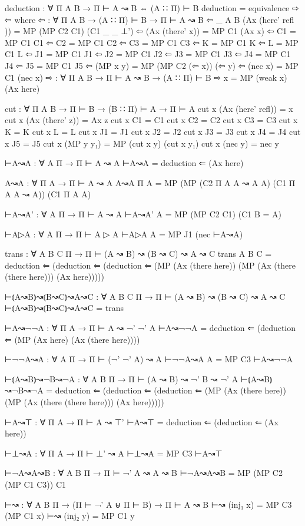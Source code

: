 \begin{spverbatim}
deduction : ∀ {Π A B} → Π ⊢ A ↝ B ⇔ (A ∷ Π) ⊢ B
deduction = equivalence ⇨ ⇦
  where
  ⇦ : ∀ {Π A B} → (A ∷ Π) ⊢ B → Π ⊢ A ↝ B
  ⇦ {_} {A} {B} (Ax (here' refl )) = MP (MP C2 C1) (C1 {_} {_} {⊥'})
  ⇦ (Ax (there' x)) = MP C1 (Ax x)
  ⇦ C1 = MP C1 C1
  ⇦ C2 = MP C1 C2
  ⇦ C3 = MP C1 C3
  ⇦ K = MP C1 K
  ⇦ L = MP C1 L
  ⇦ J1 = MP C1 J1
  ⇦ J2 = MP C1 J2
  ⇦ J3 = MP C1 J3
  ⇦ J4 = MP C1 J4
  ⇦ J5 = MP C1 J5
  ⇦ (MP x y) = MP (MP C2 (⇦ x)) (⇦ y)
  ⇦ (nec x) = MP C1 (nec x)
  ⇨ : ∀ {Π A B} → Π ⊢ A ↝ B → (A ∷ Π) ⊢ B
  ⇨ x = MP (weak x) (Ax here)

cut : ∀ {Π A B} → Π ⊢ B → (B ∷ Π) ⊢ A → Π ⊢ A
cut x (Ax (here' refl)) = x
cut x (Ax (there' z)) = Ax z
cut x C1 = C1
cut x C2 = C2
cut x C3 = C3
cut x K = K
cut x L = L
cut x J1 = J1
cut x J2 = J2
cut x J3 = J3
cut x J4 = J4
cut x J5 = J5
cut x (MP y y₁) = MP (cut x y) (cut x y₁)
cut x (nec y) = nec y

⊢A↝A : ∀ {A Π} → Π ⊢ A ↝ A
⊢A↝A = deduction ⇐ (Ax here)

A↝A : ∀ {Π A} → Π ⊢ A ↝ A
A↝A {Π} {A} = MP (MP (C2 {Π} {A} {A ↝ A} {A}) (C1 {Π} {A} {A ↝ A})) (C1 {Π} {A} {A})

⊢A↝A' : ∀ {A Π} → Π ⊢ A ↝ A
⊢A↝A' {A} = MP (MP C2 C1) (C1 {B = A})

⊢A▷A : ∀ {A Π} → Π ⊢ A ▷ A
⊢A▷A {A} = MP J1 (nec ⊢A↝A)

trans : ∀ {A B C Π} → Π ⊢ (A ↝ B) ↝ (B ↝ C) ↝ A ↝ C
trans {A} {B} {C} = deduction ⇐ (deduction ⇐ (deduction ⇐ (MP (Ax (there here))
  (MP (Ax (there (there here))) (Ax here)))))

⊢⦅A↝B⦆↝⦅B↝C⦆↝A↝C : ∀ {A B C Π} → Π ⊢ (A ↝ B) ↝ (B ↝ C) ↝ A ↝ C
⊢⦅A↝B⦆↝⦅B↝C⦆↝A↝C = trans

⊢A↝¬¬A : ∀ {Π A} → Π ⊢ A ↝ ¬' ¬' A
⊢A↝¬¬A = deduction ⇐ (deduction ⇐ (MP (Ax here) (Ax (there here))))

⊢¬¬A↝A : ∀ {A Π} → Π ⊢ (¬' ¬' A) ↝ A
⊢¬¬A↝A {A} = MP C3 ⊢A↝¬¬A

⊢⦅A↝B⦆↝¬B↝¬A : ∀ {A B Π} → Π ⊢ (A ↝ B) ↝ ¬' B ↝ ¬' A
⊢⦅A↝B⦆↝¬B↝¬A = deduction ⇐ (deduction ⇐ (deduction ⇐ (MP (Ax (there here))
  (MP (Ax (there (there here))) (Ax here)))))

⊢A↝⊤ : ∀ {Π A} → Π ⊢ A ↝ ⊤'
⊢A↝⊤ = deduction ⇐ (deduction ⇐ (Ax here))

⊢⊥↝A : ∀ {Π A} → Π ⊢ ⊥' ↝ A
⊢⊥↝A = MP C3 ⊢A↝⊤

⊢¬A↝A↝B : ∀ {A B Π} → Π ⊢ ¬' A ↝ A ↝ B
⊢¬A↝A↝B = MP (MP C2 (MP C1 C3)) C1

⊢↝ : ∀ {A B Π} → (Π ⊢ ¬' A ⊎ Π ⊢ B) → Π ⊢ A ↝ B
⊢↝ (inj₁ x) = MP C3 (MP C1 x)
⊢↝ (inj₂ y) = MP C1 y


\end{spverbatim}
